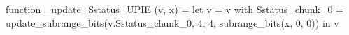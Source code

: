 function _update_Sstatus_UPIE (v, x) = let v = { v with Sstatus_chunk_0 = update_subrange_bits(v.Sstatus_chunk_0, 4, 4, subrange_bits(x, 0, 0)) } in
  v
